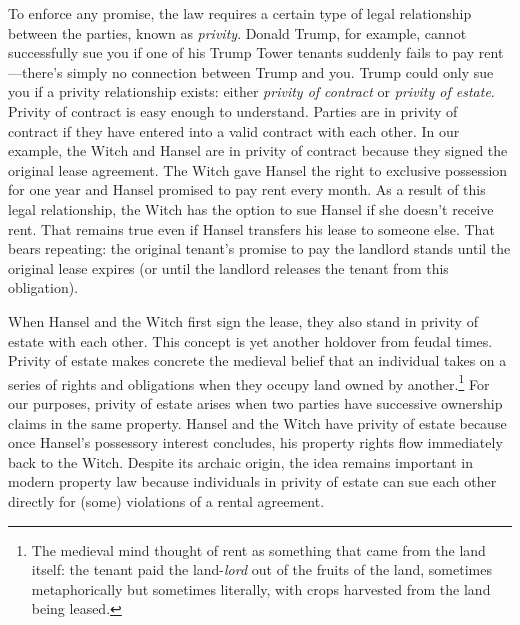 To enforce any promise, the law requires a certain type of legal relationship
between the parties, known as \textit{privity}.  Donald Trump, for example,
cannot successfully sue you if one of his Trump Tower tenants suddenly fails to
pay rent---there's simply no connection between Trump and you.  Trump could
only sue you if a privity relationship exists: either \textit{privity of
contract} or \textit{privity of estate}.  Privity of contract is easy enough to
understand.  Parties are in privity of contract if they have entered into a
valid contract with each other.  In our example, the Witch and Hansel are in
privity of contract because they signed the original lease agreement.  The
Witch gave Hansel the right to exclusive possession for one year and Hansel
promised to pay rent every month.  As a result of this legal relationship, the
Witch has the option to sue Hansel if she doesn't receive rent.  That remains
true even if Hansel transfers his lease to someone else.  That bears repeating:
the original tenant's promise to pay the landlord stands until the original
lease expires (or until the landlord releases the tenant from this obligation).
 
When Hansel and the Witch first sign the lease, they also stand in privity of
estate with each other.  This concept is yet another holdover from feudal
times.  Privity of estate makes concrete the medieval belief that an individual
takes on a series of rights and obligations when they occupy land owned by
another.\footnote{The medieval mind thought of rent as something that came
from the land itself: the tenant paid the land-\textit{lord} out of the fruits
of the land, sometimes metaphorically but sometimes literally, with crops
harvested from the land being leased.}  For our purposes, privity of estate
arises when two parties have successive ownership claims in the same property.
Hansel and the Witch have privity of estate because once Hansel's possessory
interest concludes, his property rights flow immediately back to the Witch. 
Despite its archaic origin, the idea remains important in modern property law
because individuals in privity of estate can sue each other directly for (some)
violations of a rental agreement.

